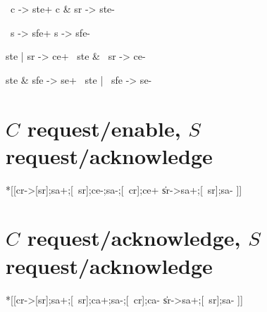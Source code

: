 \documentclass{article}
\begin{document}
\begin{prs2}
~c -> ste+
c & sr -> ste-

~s -> sfe+
s -> sfe-
\end{prs2}

\begin{prs2}
ste | sr -> ce+
~ste & ~sr -> ce-
\end{prs2}

\begin{prs2}
ste & sfe -> se+
~ste | ~sfe -> se-
\end{prs2}

\section{$C$ request/enable, $S$ request/acknowledge}

\begin{hse}
*[[cr->[sr];sa+;[~sr];ce-;sa-;[~cr];ce+
  \|sr->sa+;[~sr];sa-
 ]]
\end{hse}

\section{$C$ request/acknowledge, $S$ request/acknowledge}

\begin{hse}
*[[cr->[sr];sa+;[~sr];ca+;sa-;[~cr];ca-
  \|sr->sa+;[~sr];sa-
 ]]
\end{hse}

\end{document}
